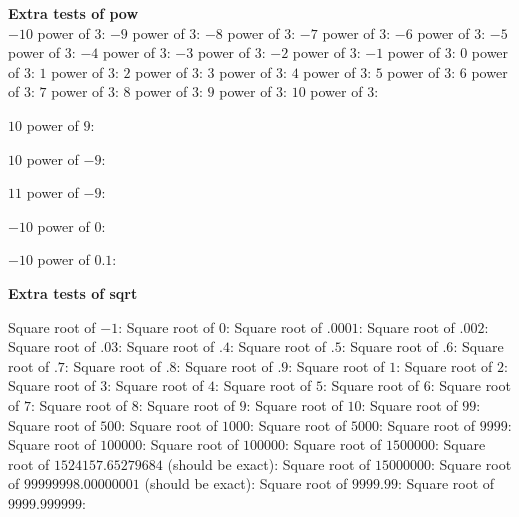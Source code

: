 \filbreak
{\bf Extra tests of pow}\\
  $-10$ power of $3$:\Z\w
   $-9$ power of $3$:\Z\w
   $-8$ power of $3$:\Z\w
   $-7$ power of $3$:\Z\w
   $-6$ power of $3$:\Z\w
   $-5$ power of $3$:\Z\w
   $-4$ power of $3$:\Z\w
   $-3$ power of $3$:\Z\w
   $-2$ power of $3$:\Z\w
   $-1$ power of $3$:\Z\w
    $0$ power of $3$:\Z\w
    $1$ power of $3$:\Z\w
    $2$ power of $3$:\Z\w
    $3$ power of $3$:\Z\w
    $4$ power of $3$:\Z\w
    $5$ power of $3$:\Z\w
    $6$ power of $3$:\Z\w
    $7$ power of $3$:\Z\w
    $8$ power of $3$:\Z\w
    $9$ power of $3$:\Z\w
   $10$ power of $3$:\Z\w
\immediate{}
   $10$ power of $9$:\Z\w
\immediate{}
  $10$ power of $-9$:\Z\w
\immediate{}
  $11$ power of $-9$:\Z\w
\immediate{}
  $-10$ power of $0$:\Z\w
\immediate{}
  $-10$ power of $0.1$:\Z\W

\filbreak
{\bf Extra tests of sqrt}\\
\immediate{}
    Square root of $-1$:\Z\w
     Square root of $0$:\Z\w
 Square root of $.0001$:\Z\w
  Square root of $.002$:\Z\w
   Square root of $.03$:\Z\w
    Square root of $.4$:\Z\w
    Square root of $.5$:\Z\w
    Square root of $.6$:\Z\w
    Square root of $.7$:\Z\w
    Square root of $.8$:\Z\w
    Square root of $.9$:\Z\w
    Square root of $1$:\Z\w
    Square root of $2$:\Z\w
    Square root of $3$:\Z\w
    Square root of $4$:\Z\w
    Square root of $5$:\Z\w
    Square root of $6$:\Z\w
    Square root of $7$:\Z\w
    Square root of $8$:\Z\w
    Square root of $9$:\Z\w
   Square root of $10$:\Z\w
   Square root of $99$:\Z\w
  Square root of $500$:\Z\w
 Square root of $1000$:\Z\w
 Square root of $5000$:\Z\w
 Square root of $9999$:\Z\w
Square root of $100000$:\Z\w
Square root of $100000$:\Z\w
Square root of $1500000$:\Z\w
Square root of $1524157.65279684$ (should be exact):\Z\w
Square root of $15000000$:\Z\w
Square root of $99999998.00000001$ (should be exact):\Z\w
                            Square root of $9999.99$:\Z\w
                       Square root of $9999.999 999$:\Z\W

